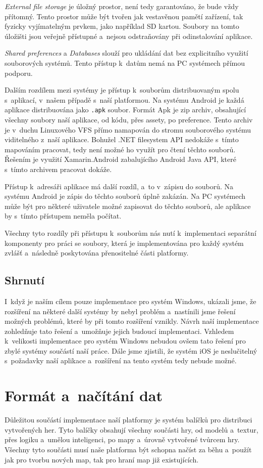 \textit{External file storage} je   úložný prostor, není tedy garantováno, že bude vždy přítomný. Tento prostor může být tvořen jak vestavěnou pamětí zařízení, tak fyzicky vyjímatelným prvkem, jako například SD kartou. Soubory na tomto úložišti jsou veřejně přístupné a~nejsou odstraňovány při odinstalování aplikace. 

\textit{Shared preferences} a \textit{Databases} slouží pro ukládání dat bez explicitního využití souborových systémů. Tento přístup k~datům nemá na PC systémech přímou podporu.


Dalším rozdílem mezi systémy je přístup k~souborům distribuovaným spolu s~aplikací, v~našem případě s~naší platformou. Na systému Android je každá aplikace distribuována jako \texttt{.apk} soubor. Formát Apk je zip archiv, obsahující všechny soubory naší aplikace, od kódu, přes assety, po preference. Tento archiv je v~duchu Linuxového VFS přímo namapován do stromu souborového systému viditelného z~naší aplikace. Bohužel .NET filesystem API nedokáže s~tímto mapováním pracovat, tedy není možné ho využít pro čtení těchto souborů. Řešením je využití Xamarin.Android zabalujícího Android Java API, které s~tímto archivem pracovat dokáže.

Přístup k~adresáři aplikace má další rozdíl, a~to v~zápisu do souborů. Na systému Android je zápis do těchto souborů úplně zakázán. Na PC systémech může být pro některé uživatele možné zapisovat do těchto souborů, ale aplikace by s~tímto přístupem neměla počítat.

Všechny tyto rozdíly při přístupu k~souborům nás nutí k~implementaci separátní komponenty pro práci se soubory, která je implementována pro každý systém zvlášť a~následně poskytována přenositelné části platformy.

\subsection{Shrnutí}
I~když je naším cílem pouze implementace pro systém Windows, ukázali jsme, že rozšíření na některé další systémy by nebyl problém a~nastínili jsme řešení možných problémů, které by při tomto rozšíření vznikly. Návrh naší implementace zohledňuje tato řešení a~umožňuje jejich  budoucí implementaci. Vzhledem k~velikosti implementace pro systém Windows nebudou ovšem tato řešení pro zbylé systémy součástí naší práce. Dále jsme zjistili, že systém iOS je neslučitelný s~požadavky naší aplikace a~rozšíření na tento systém tedy nebude možné.

\section{Formát a~načítání dat}
Důležitou součástí implementace naší platformy je systém balíčků pro distribuci vytvořených her. Tyto balíčky obsahují všechny součásti hry, od modelů a~textur, přes logiku a~umělou inteligenci, po mapy a~úrovně vytvořené tvůrcem hry. Všechny tyto součásti musí naše platforma být schopna načíst za běhu a~použít jak pro tvorbu nových map, tak pro hraní map již existujících.

